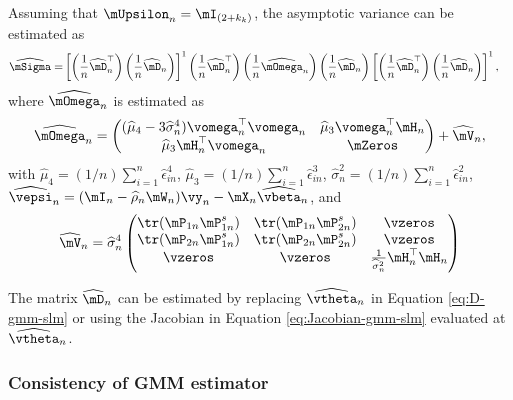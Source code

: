 \documentclass[english,12pt]{book}\usepackage[]{graphicx}\usepackage[]{xcolor}
\begin{document}
Assuming that $\mUpsilon_n = \mI_{(2 + k_k)}$, the asymptotic variance can be estimated as
\begin{equation*}
\begin{aligned}
  \widehat{\mSigma} = &  \left[\left(\frac{1}{n}\widehat{\mD}_n^\top\right)\left(\frac{1}{n}\widehat{\mD}_n\right)\right]^{1}\left(\frac{1}{n}\widehat{\mD}_n^\top\right)\left(\frac{1}{n}\widehat{\mOmega}_n\right)\left(\frac{1}{n}\widehat{\mD}_n\right) \left[\left(\frac{1}{n}\widehat{\mD}_n^\top\right)\left(\frac{1}{n}\widehat{\mD}_n\right)\right]^{1},
  \end{aligned}
\end{equation*}
%
where $\widehat{\mOmega}_n$ is estimated as
\begin{equation}\label{eq:omega-slm-hat}
\widehat{\mOmega}_n = \begin{pmatrix}
              (\widehat{\mu}_4 - 3\widehat{\sigma}_n^4)\vomega_n^\top\vomega_n & \widehat{\mu}_3\vomega^\top_n\mH_n \\
              \widehat{\mu}_3 \mH_n^\top\vomega_n & \mZeros 
            \end{pmatrix}
             + 
             \widehat{\mV}_n,
\end{equation}
%
with $\widehat{\mu}_4 = (1/n)\sum_{i  = 1}^n\widehat{\epsilon}_{in}^4$, $\widehat{\mu}_3 = (1/n)\sum_{i  = 1}^n\widehat{\epsilon}_{in}^3$, $\widehat{\sigma}_n^2 = (1/n)\sum_{i = 1}^n\widehat{\epsilon}_{in}^2$,  $\widehat{\vepsi}_n = (\mI_n - \widehat{\rho}_n\mW_n)\vy_n - \mX_n\widehat{\vbeta}_n$, and 
\begin{equation*}
  \widehat{\mV}_n = \widehat{\sigma}_n^4
          \begin{pmatrix}
          \tr(\mP_{1n}\mP_{1n}^s) & \tr(\mP_{1n}\mP_{2n}^s) & \vzeros \\
          \tr(\mP_{2n}\mP_{1n}^s) & \tr(\mP_{2n}\mP_{2n}^s) & \vzeros \\
          \vzeros & \vzeros & \frac{1}{\widehat{\sigma}_n^2}\mH_n^\top\mH_n
          \end{pmatrix}
\end{equation*}

The matrix $\widehat{\mD}_n$ can be estimated by replacing $\widehat{\vtheta}_n$ in Equation \eqref{eq:D-gmm-slm} or using the Jacobian in Equation \eqref{eq:Jacobian-gmm-slm} evaluated at $\widehat{\vtheta}_n$. 

\subsubsection{Consistency of GMM estimator}
\end{document}

